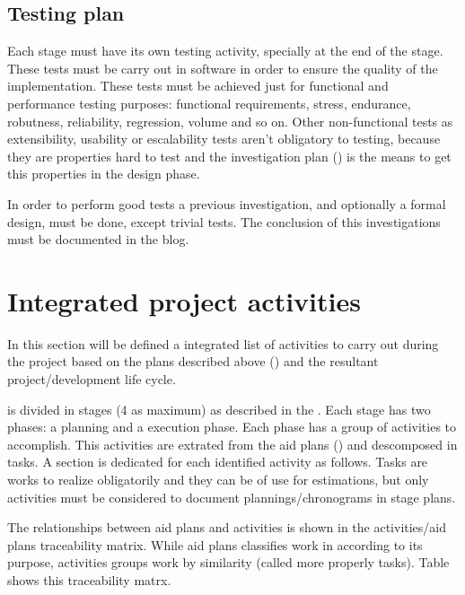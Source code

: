 \documentclass[twocolumn, 9pt]{extarticle}
\begin{document}
\subsection{Testing plan}
\label{ssec:testing-plan}
Each stage must have its own testing activity, specially at the end of
the stage. These tests must be carry out in software in order to
ensure the quality of the implementation. These tests must be achieved
just for functional and performance testing purposes:
functional requirements, stress, endurance,
robutness, reliability, regression, volume and so on. Other
non-functional tests as extensibility, usability or escalability tests
aren't obligatory to testing, because they are properties hard to test
and the investigation plan () is the
means to get this properties in the design phase.

In order to perform good tests a previous investigation, and
optionally a formal design, must be done, except trivial tests. The
conclusion of this investigations must be documented in the \fav
blog.

\section{Integrated project activities}
\label{sec:integrated-activities}
In this section will be defined a integrated list of activities to
carry out during the project based on the plans described above
() and the resultant project/development life
cycle.

\favp is divided in stages (4 as maximum) as described in the
\favc. Each stage has two phases: a planning and a execution
phase. Each phase has a group of activities to
accomplish. This activities are extrated from the aid plans
() and descomposed in tasks. A section is
dedicated for each identified activity as follows. Tasks are works to
realize obligatorily and they can be of use for estimations, but only
activities must be considered to document plannings/chronograms in
stage plans.

The relationships between aid plans and activities is shown in the
activities/aid plans traceability matrix. While aid plans classifies
work in according to its purpose, activities groups work by similarity
(called more properly tasks). Table  shows this
traceability matrx.
\end{document}
